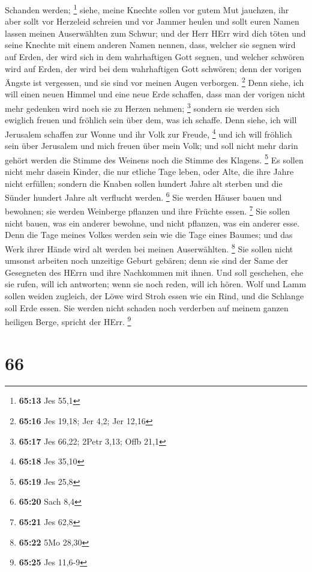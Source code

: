 Schanden werden; \footnote{\textbf{65:13} Jes 55,1}  siehe,
meine Knechte sollen vor gutem Mut jauchzen, ihr aber sollt vor
Herzeleid schreien und vor Jammer heulen  und sollt euren
Namen lassen meinen Auserwählten zum Schwur; und der Herr HErr wird dich
töten und seine Knechte mit einem anderen Namen nennen, 
dass, welcher sie segnen wird auf Erden, der wird sich in dem
wahrhaftigen Gott segnen, und welcher schwören wird auf Erden, der wird
bei dem wahrhaftigen Gott schwören; denn der vorigen Ängste ist
vergessen, und sie sind vor meinen Augen verborgen. \footnote{\textbf{65:16}
  Jes 19,18; Jer 4,2; Jer 12,16}  Denn siehe, ich will
einen neuen Himmel und eine neue Erde schaffen, dass man der vorigen
nicht mehr gedenken wird noch sie zu Herzen nehmen; \footnote{\textbf{65:17}
  Jes 66,22; 2Petr 3,13; Offb 21,1}  sondern sie werden
sich ewiglich freuen und fröhlich sein über dem, was ich schaffe. Denn
siehe, ich will Jerusalem schaffen zur Wonne und ihr Volk zur Freude,
\footnote{\textbf{65:18} Jes 35,10}  und ich will fröhlich
sein über Jerusalem und mich freuen über mein Volk; und soll nicht mehr
darin gehört werden die Stimme des Weinens noch die Stimme des Klagens.
\footnote{\textbf{65:19} Jes 25,8}  Es sollen nicht mehr
dasein Kinder, die nur etliche Tage leben, oder Alte, die ihre Jahre
nicht erfüllen; sondern die Knaben sollen hundert Jahre alt sterben und
die Sünder hundert Jahre alt verflucht werden. \footnote{\textbf{65:20}
  Sach 8,4}  Sie werden Häuser bauen und bewohnen; sie
werden Weinberge pflanzen und ihre Früchte essen. \footnote{\textbf{65:21}
  Jes 62,8}  Sie sollen nicht bauen, was ein anderer
bewohne, und nicht pflanzen, was ein anderer esse. Denn die Tage meines
Volkes werden sein wie die Tage eines Baumes; und das Werk ihrer Hände
wird alt werden bei meinen Auserwählten. \footnote{\textbf{65:22} 5Mo
  28,30}  Sie sollen nicht umsonst arbeiten noch unzeitige
Geburt gebären; denn sie sind der Same der Gesegneten des HErrn und ihre
Nachkommen mit ihnen.  Und soll geschehen, ehe sie rufen,
will ich antworten; wenn sie noch reden, will ich hören. 
Wolf und Lamm sollen weiden zugleich, der Löwe wird Stroh essen wie ein
Rind, und die Schlange soll Erde essen. Sie werden nicht schaden noch
verderben auf meinem ganzen heiligen Berge, spricht der HErr.
\footnote{\textbf{65:25} Jes 11,6-9}

\hypertarget{section-25}{%
\section{66}\label{section-25}}

